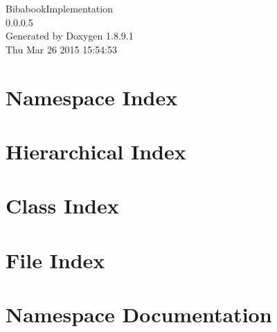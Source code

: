 \documentclass[twoside]{book}
\newcommand{\+}{\discretionary{\mbox{\scriptsize$\hookleftarrow$}}{}{}}
\newcommand{\clearemptydoublepage}{%
  \newpage{\pagestyle{empty}\cleardoublepage}%
}
\begin{document}
\hypersetup{pageanchor=false,
             bookmarks=true,
             bookmarksnumbered=true,
             pdfencoding=unicode
            }
\begin{titlepage}
\vspace*{7cm}
\begin{center}%
{\Large Bibabook\+Implementation \\[1ex]\large 0.\+0.\+0.\+5 }\\
\vspace*{1cm}
{\large Generated by Doxygen 1.8.9.1}\\
\vspace*{0.5cm}
{\small Thu Mar 26 2015 15:54:53}\\
\end{center}
\end{titlepage}
\clearemptydoublepage
\tableofcontents
\clearemptydoublepage
{}
\hypersetup{pageanchor=true}

\chapter{Namespace Index}

\chapter{Hierarchical Index}

\chapter{Class Index}

\chapter{File Index}

\chapter{Namespace Documentation}















\end{document}
